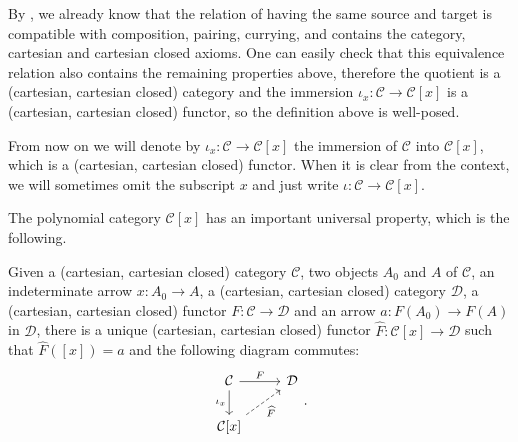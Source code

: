 \begin{remark}
    By , we already know that the relation of having the same source and target is compatible with composition, pairing, currying, and contains the category, cartesian and cartesian closed axioms.
    One can easily check that this equivalence relation also contains the remaining properties above, therefore the quotient is a (cartesian, cartesian closed) category and the immersion $\iota_x : \mathcal C \rightarrow \mathcal C[x]$ is a (cartesian, cartesian closed) functor,
    so the definition above is well-posed.
\end{remark}

\begin{notation}
    From now on we will denote by $\iota_x : \mathcal C \rightarrow \mathcal C[x]$ the immersion of $\mathcal C$ into $\mathcal C[x]$, which is a (cartesian, cartesian closed) functor.
    When it is clear from the context, we will sometimes omit the subscript $x$ and just write $\iota : \mathcal C \rightarrow \mathcal C[x]$.
\end{notation}

The polynomial category $\mathcal C[x]$ has an important universal property, which is the following.

\begin{theorem}
    Given a (cartesian, cartesian closed) category $\mathcal C$, two objects $A_0$ and $A$ of $\mathcal C$, an indeterminate arrow $x : A_0 \to A$, a (cartesian, cartesian closed) category $\mathcal D$, a (cartesian, cartesian closed) functor $F : \mathcal C \to \mathcal D$ and an arrow $a : F(A_0) \to F(A)$ in $\mathcal D$,
    there is a unique (cartesian, cartesian closed) functor $\widehat F : \mathcal C[x] \to \mathcal D$ such that $\widehat F([x]) = a$ and the following diagram commutes:
    \[\begin{tikzcd}
        {\mathcal C} & {\mathcal D} \\
        {\mathcal C[x]}
        \arrow["F", from=1-1, to=1-2]
        \arrow["{\iota_x}"', from=1-1, to=2-1]
        \arrow["{\widehat F}"', dashed, from=2-1, to=1-2]
    \end{tikzcd}.\]
\end{theorem}

